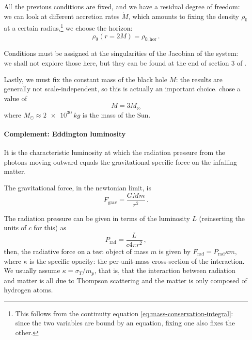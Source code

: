 \documentclass[main.tex]{subfiles}
\begin{document}
All the previous conditions are fixed, and we have a residual degree of freedom: we can look at different accretion rates \(\dot{M}\), which amounts to fixing the density
\(\rho_0\) at a certain radius,\footnote{This follows from the continuity equation  \eqref{eq:mass-conservation-integral}: since the two variables are bound by an equation, fixing one also fixes the other.} we choose the horizon:
%
\begin{equation}
  \rho_0(r = 2M) = \rho_{0, \text{hor}}\,.
\end{equation}

Conditions must be assigned at the singularities of the Jacobian of the system: we shall not explore those here, but they can be found at the end of section 3 of \cite[]{NobiliTurollaZampieri:1991dec}.

Lastly, we must fix the constant mass of the black hole \(M\): the results are generally not scale-independent, so this is actually an important choice. \textcite[]{NobiliTurollaZampieri:1991dec} chose a value of
%
\begin{equation}
    M = 3 M_{\odot}
\end{equation}
%
where \(M_\odot \approx \SI{2e30}{kg}\) is the mass of the Sun.

\paragraph{Complement: Eddington luminosity}

It is the characteristic luminosity at which the radiation pressure from the photons moving outward equals the gravitational specific force on the infalling matter.

The gravitational force, in the newtonian  limit, is
%
\begin{equation}
  F_{\text{grav}} = \frac{GMm}{r^2 }\,.
\end{equation}

The radiation pressure can be given in terms of the luminosity \(L\) (reinserting the units of \(c\) for this) as
%
\begin{equation}
  P_{\text{rad}} = \frac{L}{c 4 \pi r^2}\,,
\end{equation}
then, the radiative force on a test object of mass \(m\) is given by \(F_{\text{rad}} =  P_{\text{rad}} \kappa m\), where \(\kappa\) is the specific opacity: the per-unit-mass cross-section of the interaction. We usually assume \(\kappa = \sigma_T/m_p\), that is, that the interaction between radiation and matter is all due to Thompson scattering and the matter is only composed of hydrogen atoms.
\end{document}
